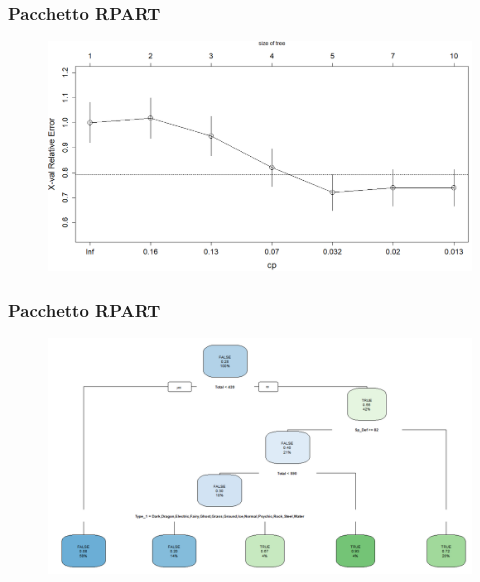 	\begin{frame}
		\frametitle{Pacchetto RPART}
		\begin{center}
			\begin{figure}
				
			\end{figure}
			\begin{figure}
				\includegraphics[scale=0.3]{img/cvginirpart}
			\end{figure}
		\end{center}
	\end{frame}


	\begin{frame}
		\frametitle{Pacchetto RPART}
		\begin{center}
			\begin{figure}
				
			\end{figure}
			\begin{figure}
				\includegraphics[scale=0.3]{img/rpartGinipr}
			\end{figure}
		\end{center}
	\end{frame}


